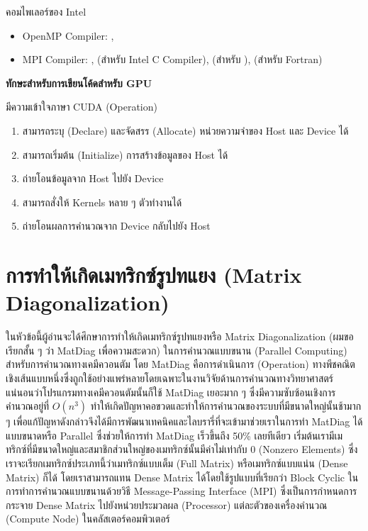 \noindent คอมไพเลอร์ของ Intel
%
\begin{itemize}[topsep=0pt,noitemsep]
  \setlength\itemsep{0.5em}
  \item OpenMP Compiler: , 

  \item MPI Compiler: ,  (สำหรับ Intel C Compiler),
         (สำหรับ \cpp),  (สำหรับ Fortran)
\end{itemize}

\noindent \textbf{ทักษะสำหรับการเขียนโค้ดสำหรับ GPU}

\noindent มีความเข้าใจภาษา CUDA (Operation)
%
\begin{enumerate}[topsep=0pt,noitemsep]
  \setlength\itemsep{0.5em}
  \item สามารถระบุ (Declare) และจัดสรร (Allocate) หน่วยความจำของ Host และ Device ได้

  \item สามารถเริ่มต้น (Initialize) การสร้างข้อมูลของ Host ได้

  \item ถ่ายโอนข้อมูลจาก Host ไปยัง Device

  \item สามารถสั่งให้ Kernels หลาย ๆ ตัวทำงานได้

  \item ถ่ายโอนผลการคำนวณจาก Device กลับไปยัง Host
\end{enumerate}

\section{การทำให้เกิดเมทริกซ์รูปทแยง (Matrix Diagonalization)}

ในหัวข้อนี้ผู้อ่านจะได้ศึกษาการทำให้เกิดเมทริกซ์รูปทแยงหรือ Matrix Diagonalization (ผมขอเรียกสั้น ๆ ว่า MatDiag เพื่อความสะดวก)
ในการคำนวณแบบขนาน (Parallel Computing) สำหรับการคำนวณทางเคมีควอนตัม โดย MatDiag คือการดำเนินการ (Operation)
ทางพีชคณิตเชิงเส้นแบบหนึ่งซึ่งถูกใช้อย่างแพร่หลายโดยเฉพาะในงานวิจัยด้านการคำนวณทางวิทยาศาสตร์ แน่นอนว่าโปรแกรมทางเคมีควอนตัมนั้นก็ใช้
MatDiag เยอะมาก ๆ ซึ่งมีความซับซ้อนเชิงการคำนวณอยู่ที่ $O(n^3)$ ทำให้เกิดปัญหาคอขวดและทำให้การคำนวณของระบบที่มีขนาดใหญ่นั้นช้ามาก ๆ
เพื่อแก้ปัญหาดังกล่าวจึงได้มีการพัฒนาเทคนิคและไลบรารี่ที่จะเข้ามาช่วยเราในการทำ MatDiag ได้แบบขนาดหรือ Parallel ซึ่งช่วยให้การทำ
MatDiag เร็วขึ้นถึง 50\% เลยทีเดียว เริ่มต้นเรามีเมทริกซ์ที่มีขนาดใหญ่และสมาชิกส่วนใหญ่ของเมทริกซ์นั้นมีค่าไม่เท่ากับ 0 (Nonzero Elements)
ซึ่งเราจะเรียกเมทริกซ์ประเภทนี้ว่าเมทริกซ์แบบเต็ม (Full Matrix) หรือเมทริกซ์แบบแน่น (Dense Matrix) ก็ได้ โดยเราสามารถแทน Dense
Matrix ได้โดยใช้รูปแบบที่เรียกว่า Block Cyclic ในการทำการคำนวณแบบขนานด้วยวิธี Message-Passing Interface (MPI)
ซึ่งเป็นการกำหนดการกระจาย Dense Matrix ไปยังหน่วยประมวลผล (Processor) แต่ละตัวของเครื่องคำนวณ (Compute Node)
ในคลัสเตอร์คอมพิวเตอร์

